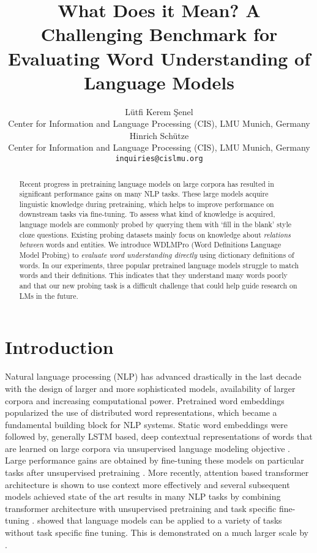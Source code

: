 \documentclass[11pt,a4paper]{article}
\title{What Does it Mean? A Challenging Benchmark for Evaluating Word Understanding of Language Models}
\author{Lütfi Kerem Şenel \\
  Center for Information and Language Processing (CIS), LMU Munich, Germany \\
  Hinrich Schütze \\
    Center for Information and Language Processing (CIS), LMU Munich, Germany \\
  \texttt{inquiries@cislmu.org} \\
  }
\date{}
\begin{document}
\maketitle
\begin{abstract}

Recent progress in pretraining language models on large
corpora has resulted in significant performance gains on many NLP
tasks. These large models acquire linguistic knowledge
during pretraining, which helps to improve
performance on downstream tasks via fine-tuning. To assess
what kind of knowledge is acquired,
language models are commonly probed by querying them with
`fill in the blank' style cloze questions. Existing probing
datasets mainly focus on knowledge about \emph{relations between}
words and entities. We introduce WDLMPro (Word Definitions
Language Model Probing) to \emph{evaluate word understanding
  directly} using dictionary definitions of
words. In our experiments, three popular pretrained
language models
struggle to match words and their  definitions. This
indicates that they understand many words poorly and that
our new probing task is a difficult challenge that could
help guide research on LMs in the future.
\end{abstract}



\section{Introduction}

Natural language processing (NLP)  has advanced drastically
in the last decade with the design of larger and more
sophisticated models, availability of larger
corpora and increasing computational
power. Pretrained word embeddings
\cite{mikolov13word2vec_b, pennington14glove} popularized
the use of distributed word representations, which became a
fundamental building block for NLP systems. Static word
embeddings were followed by, generally LSTM based, deep
contextual representations of words that are learned on
large corpora via unsupervised language modeling objective
\cite{peters18ELMO}. Large performance gains are obtained
by fine-tuning these models on particular tasks after
unsupervised pretraining \cite{radford18fineTuning,
  howard18ULMFiT}. More recently, attention based
transformer architecture is shown to use context more
effectively \cite{vaswani17transformers} and several
subsequent models achieved state of the art results in many
NLP tasks by combining transformer architecture with
unsupervised pretraining and task specific fine-tuning
\cite{devlin19BERT, liu19RoBERTa}. 
showed that language models can be applied to a variety of
tasks without task specific fine tuning. This is demonstrated on a much larger scale by . 
\end{document}
